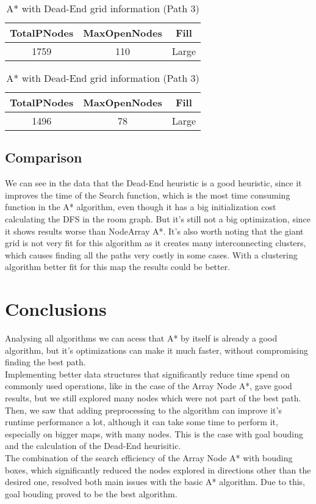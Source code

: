 \documentclass{article}
\begin{document}
  \begin{table}[h!]
    \parbox{.45\linewidth}{
        \centering
        \caption{A* with Dead-End grid information (Path 2)}
        \label{tab:tableDeadEndGrid2}
        \begin{tabular}{c|c|c}
          \textbf{TotalPNodes} & \textbf{MaxOpenNodes} & \textbf{Fill}\\
          \hline
          1759 & 110 & Large\\
        \end{tabular}
    }
    \hfil
    \parbox{.45\linewidth}{
        \centering
        \caption{A* with Dead-End grid information (Path 3)}
        \label{tab:tableDeadEndGrid3}
        \begin{tabular}{c|c|c}
          \textbf{TotalPNodes} & \textbf{MaxOpenNodes} & \textbf{Fill}\\
          \hline
          1496 & 78 & Large\\
        \end{tabular}
    }
  \end{table}

  \subsection{Comparison}
  We can see in the data that the Dead-End heuristic is a good heuristic, since it improves the time of the Search function, which is the most time consuming function 
  in the A* algorithm, even though it has a big initialization cost calculating the DFS in the room graph. But it's still not a big optimization, since it shows 
  results worse than NodeArray A*. It's also worth noting that the giant grid is not very fit for this algorithm as it creates many interconnecting clusters, which
  causes finding all the paths very costly in some cases. With a clustering algorithm better fit for this map the results could be better.\\

  \section{Conclusions}
  Analysing all algorithms we can acess that A* by itself is already a good algorithm, but it's optimizations can make it much faster, 
  without compromising finding the best path.\\
  Implementing better data structures that significantly reduce time spend on commonly used operations, like in the case of the Array Node A*, 
  gave good results, but we still explored many nodes which were not part of the best path.\\
  Then, we saw that adding preprocessing to the algorithm can improve it's runtime performance a lot, although it can take some time to perform it, 
  especially on bigger maps, with many nodes. This is the case with goal bouding and the calculation of the Dead-End heurisitic.\\
  The combination of the search efficiency of the Array Node A* with bouding boxes, which significantly reduced the nodes explored 
  in directions other than the desired one, resolved both main issues with the basic A* algorithm. Due to this, goal bouding proved to be the best algorithm.
\end{document}
